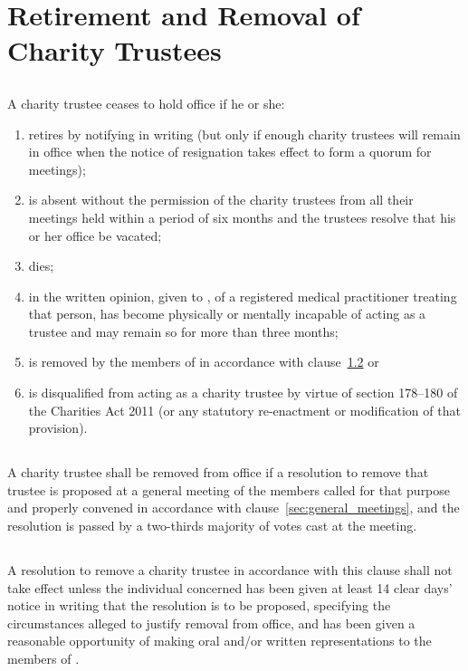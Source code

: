 \section{Retirement and Removal of Charity Trustees}\label{sec:retirement_removal}

    \subsection{}\label{sec:retirement}
    A charity trustee ceases to hold office if he or she:
    \begin{enumerate}
        \item retires by notifying \shortname{} in writing (but only if enough charity trustees will remain in office when the notice of resignation takes effect to form a quorum for meetings);
        \item is absent without the permission of the charity trustees from all their meetings held within a period of six months and the trustees resolve that his or her office be vacated;
        \item dies;
        \item in the written opinion, given to \shortname{}, of a registered medical practitioner treating that person, has become physically or mentally incapable of acting as a trustee and may remain so for more than three months;
        \item is removed by the members of \shortname{} in accordance with clause~\ref{sec:removal} or
        \item\label{item:trustee_disqualification} is disqualified from acting as a charity trustee by virtue of section 178--180 of the Charities Act 2011 (or any statutory re-enactment or modification of that provision).
    \end{enumerate}

    \subsection{}\label{sec:removal}
    A charity trustee shall be removed from office if a resolution to remove that trustee is proposed at a general meeting of the members called for that purpose and properly convened in accordance with clause~\ref{sec:general_meetings}, and the resolution is passed by a two-thirds majority of votes cast at the meeting.

    \subsection{}
    A resolution to remove a charity trustee in accordance with this clause shall not take effect unless the individual concerned has been given at least 14 clear days' notice in writing that the resolution is to be proposed, specifying the circumstances alleged to justify removal from office, and has been given a reasonable opportunity of making oral and/or written representations to the members of \shortname{}.

